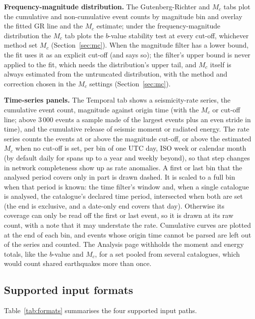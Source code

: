 \documentclass[12pt]{article}
\begin{document}
\textbf{Frequency-magnitude distribution.}  The Gutenberg-Richter and $M_c$
tabs plot the cumulative and non-cumulative event counts by magnitude bin and
overlay the fitted GR line and the $M_c$ estimate; under the frequency-magnitude
distribution the $M_c$ tab plots the $b$-value stability test at every cut-off,
whichever method set $M_c$ (Section~\ref{sec:mc}).  When the magnitude filter
has a lower bound, the fit uses it as an explicit cut-off (and says so); the
filter's upper bound is never applied to the fit, which needs the distribution's
upper tail, and $M_c$ itself is always estimated from the untruncated
distribution, with the method and correction chosen in the $M_c$ settings
(Section~\ref{sec:mc}).

\textbf{Time-series panels.}  The Temporal tab shows a seismicity-rate series,
the cumulative event count, magnitude against origin time (with the $M_c$ or
cut-off line; above 3\,000 events a sample made of the largest events plus an
even stride in time), and the cumulative release of seismic moment or radiated
energy.  The rate series counts the events at or above the magnitude cut-off,
or above the estimated $M_c$ when no cut-off is set, per bin of one UTC day, ISO
week or calendar month (by default daily for spans up to a year and weekly
beyond), so that step changes in network completeness show up as rate anomalies.
A first or last bin that the analysed period covers only in part is drawn dashed.
It is scaled to a full bin when that period is known: the time filter's window
and, when a single catalogue is analysed, the catalogue's declared time period,
intersected when both are set (the end is exclusive, and a date-only end covers
that day).  Otherwise its coverage can only be read off the first or last event,
so it is drawn at its raw count, with a note that it may understate the rate.
Cumulative curves are plotted at the end of each bin, and events whose origin
time cannot be parsed are left out of the series and counted.
The Analysis page withholds the moment and energy totals, like the $b$-value and
$M_c$, for a set pooled from several catalogues, which would count shared earthquakes
more than once.

\subsection{Supported input formats}

Table~\ref{tab:formats} summarises the four supported input paths.
\end{document}
